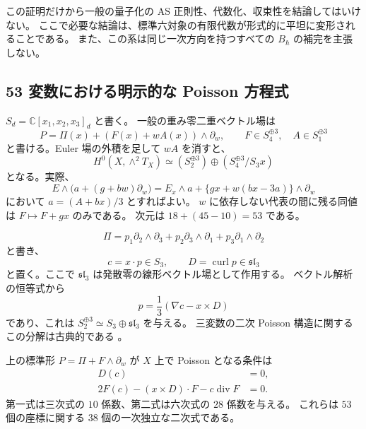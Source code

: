 この証明だけから一般の量子化の AS 正則性、代数化、収束性を結論してはいけない。
ここで必要な結論は、標準六対象の有限代数が形式的に平坦に変形されることである。
また、この系は同じ一次方向を持つすべての $B_\hbar$ の補完を主張しない。

\subsection{53 変数における明示的な Poisson 方程式}

$S_d=\mathbb C[x_1,x_2,x_3]_d$ と書く。
一般の重み零二重ベクトル場は
\[
 P=\Pi(x)+(F(x)+wA(x))\wedge\partial_w,
 \qquad F\in S_4^{\oplus3},\quad A\in S_1^{\oplus3}
\]
と書ける。Euler 場の外積を足して $wA$ を消すと、
\[
 H^0(X,\wedge^2T_X)
 \simeq (S_2^{\oplus3})\oplus(S_4^{\oplus3}/S_3x)
\]
となる。実際、
\[
 E\wedge\bigl(a+(g+bw)\partial_w\bigr)
 =E_x\wedge a+\{gx+w(bx-3a)\}\wedge\partial_w
\]
において $a=(A+bx)/3$ とすればよい。
$w$ に依存しない代表の間に残る同値は $F\mapsto F+gx$ のみである。
次元は $18+(45-10)=53$ である。

\[
 \Pi=p_1\partial_2\wedge\partial_3
       +p_2\partial_3\wedge\partial_1
       +p_3\partial_1\wedge\partial_2
\]
と書き、
\[
 c=x\cdot p\in S_3,\qquad D=\operatorname{curl}p\in\mathfrak{sl}_3
\]
と置く。ここで $\mathfrak{sl}_3$ は発散零の線形ベクトル場として作用する。
ベクトル解析の恒等式から
\[
 p=\frac13(\nabla c-x\times D)
\]
であり、これは $S_2^{\oplus3}\simeq S_3\oplus\mathfrak{sl}_3$ を与える。
三変数の二次 Poisson 構造に関するこの分解は古典的である
\cite{LiuXu1992,DoninMakarLimanov1998}。

\begin{proposition}[明示的な二次方程式]
\label{prop:weighted-poisson-equations-v31}
上の標準形 $P=\Pi+F\wedge\partial_w$ が $X$ 上で Poisson となる条件は
\begin{align}
 D(c)&=0,\label{eq:weighted-base-jacobi-v31}\\
 2F(c)-(x\times D)\cdot F-c\operatorname{div}F&=0.
 \label{eq:weighted-mixed-jacobi-v31}
\end{align}
第一式は三次式の $10$ 係数、第二式は六次式の $28$ 係数を与える。
これらは $53$ 個の座標に関する $38$ 個の一次独立な二次式である。
\end{proposition}

